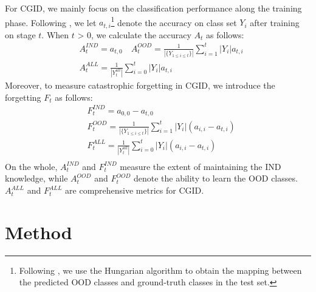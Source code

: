 \documentclass[11pt]{article}
\begin{document}
For CGID, we mainly focus on the classification performance along the training phase. Following \cite{mehta2021empirical}, we let $a_{t,i}$\footnote{Following \cite{zhang2021discovering}, we use the Hungarian algorithm \cite{kuhn1955hungarian} to obtain the mapping between the predicted OOD classes and ground-truth classes in the test set.} denote the accuracy on class set $Y_i$ after training on stage $t$. When $t$ > 0, we calculate the accuracy $A_t$ as follows:
\begin{equation}
\begin{aligned}
    & A^{IND}_t=a_{t,0}\quad A^{OOD}_{t}=\frac{1}{|\{Y_{1\leq i\leq t}\}|}\sum^t_{i=1}|Y_i|a_{t,i} \\ 
    &A^{ALL}_{t}=\frac{1}{|Y^{all}_t|}\sum^t_{i=0}|Y_i|a_{t,i}
\end{aligned}
\end{equation}
Moreover, to measure catastrophic forgetting in CGID, we introduce the forgetting  $F_t$ as follows:
\begin{equation}
\begin{aligned}
& F^{IND}_t=a_{0,0}-a_{t,0} \\
& F^{OOD}_t=\frac{1}{|\{Y_{1\leq i\leq t}\}|}\sum^t_{i=1}|Y_i|(a_{i,i}-a_{t,i})\\
& F^{ALL}_t=\frac{1}{|Y^{all}_t|}\sum^t_{i=0}|Y_i|(a_{i,i}-a_{t,i})\\
\end{aligned}
\end{equation}
On the whole, $A^{IND}_t$ and $F^{IND}_t$ measure the extent of maintaining the IND knowledge, while $A^{OOD}_{t}$ and $F^{OOD}_{t}$ denote the ability to learn the OOD classes. $A^{ALL}_{t}$ and $F^{ALL}_{t}$ are comprehensive metrics for CGID.

\section{Method}
\label{sec:method}
\end{document}
